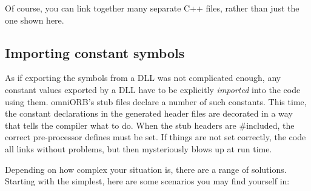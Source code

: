 \documentclass[11pt,twoside,a4paper]{book}
\begin{document}
Of course, you can link together many separate C++ files, rather than
just the one shown here.


\subsection{Importing constant symbols}

As if exporting the symbols from a DLL was not complicated enough, any
constant values exported by a DLL have to be explicitly
\emph{imported} into the code using them. omniORB's stub files declare
a number of such constants. This time, the constant declarations in
the generated header files are decorated in a way that tells the
compiler what to do. When the stub headers are \#included, the correct
pre-processor defines must be set. If things are not set correctly,
the code all links without problems, but then mysteriously blows up at
run time.

Depending on how complex your situation is, there are a range of
solutions. Starting with the simplest, here are some scenarios you may
find yourself in:
\end{document}
